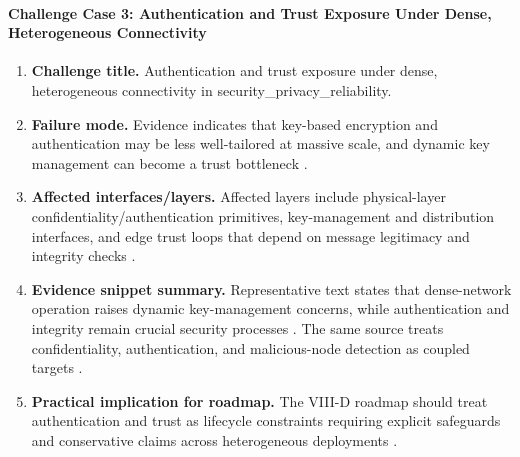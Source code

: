 \paragraph{Challenge Case 3: Authentication and Trust Exposure Under Dense, Heterogeneous Connectivity}
\begin{enumerate}
    \item \textbf{Challenge title.} Authentication and trust exposure under dense, heterogeneous connectivity in security\_privacy\_reliability.
    \item \textbf{Failure mode.} Evidence indicates that key-based encryption and authentication may be less well-tailored at massive scale, and dynamic key management can become a trust bottleneck \cite{O_ISAC_156}.
    \item \textbf{Affected interfaces/layers.} Affected layers include physical-layer confidentiality/authentication primitives, key-management and distribution interfaces, and edge trust loops that depend on message legitimacy and integrity checks \cite{O_ISAC_156}.
    \item \textbf{Evidence snippet summary.} Representative text states that dense-network operation raises dynamic key-management concerns, while authentication and integrity remain crucial security processes \cite{O_ISAC_156}. The same source treats confidentiality, authentication, and malicious-node detection as coupled targets \cite{O_ISAC_156}.
    \item \textbf{Practical implication for roadmap.} The VIII-D roadmap should treat authentication and trust as lifecycle constraints requiring explicit safeguards and conservative claims across heterogeneous deployments \cite{O_ISAC_156}.
\end{enumerate}

